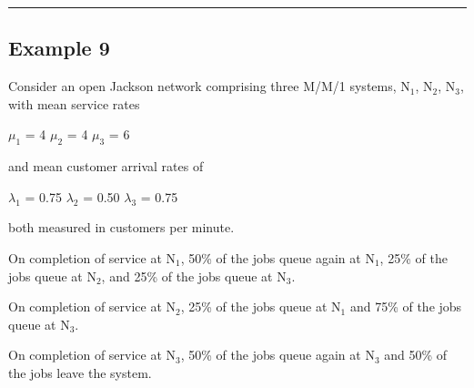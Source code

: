 \documentclass[12pt,fleqn]{report}
\begin{document}
\noindent
\hfill{\rule{160mm}{0.5mm}}

\subsection*{Example 9}

Consider an open Jackson network comprising
three M/M/1 systems, N$_1$, N$_2$, N$_3$, with mean service rates 

\begin{center}
$\mu_1$ = 4 \hspace*{0.5in} $\mu_2$ = 4 \hspace*{0.5in} $\mu_3$ = 6
\end{center}

and mean customer arrival rates of

\begin{center}
$\lambda_1$ = 0.75 \hspace*{0.5in} 
$\lambda_2$ = 0.50 \hspace*{0.5in} 
$\lambda_3$ = 0.75
\end{center}

both measured in customers per minute.

On completion of service at N$_1$,
50\% of the jobs queue again at N$_1$,
25\% of the jobs queue at N$_2$, and
25\% of the jobs queue at N$_3$.

On completion of service at N$_2$,
25\% of the jobs queue at N$_1$ and
75\% of the jobs queue at N$_3$.

On completion of service at N$_3$,
50\% of the jobs queue again at N$_3$
and 50\% of the jobs leave the system.
\end{document}

